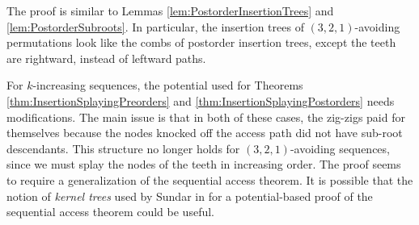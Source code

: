 \documentclass{article}
\theoremstyle{plain}
\theoremstyle{definition}
\begin{document}
%
The proof is similar to Lemmas \ref{lem:PostorderInsertionTrees} and
\ref{lem:PostorderSubroots}. In particular, the insertion trees of
$(3,2,1)$-avoiding permutations look like the combs of postorder insertion
trees, except the teeth are rightward, instead of leftward paths.

%
For $k$-increasing sequences, the potential used for Theorems
\ref{thm:InsertionSplayingPreorders} and \ref{thm:InsertionSplayingPostorders}
needs modifications. The main issue is that in both of these cases, the
zig-zigs paid for themselves because the nodes knocked off the access path did
not have sub-root descendants. This structure no longer holds for
$(3,2,1)$-avoiding sequences, since we must splay the nodes of the teeth in
increasing order. The proof seems to require a generalization of the sequential
access theorem. It is possible that the notion of \emph{kernel trees} used by
Sundar in \cite{SUNDAR_DEQUE} for a potential-based proof of the sequential
access theorem could be useful.

\printbibliography
\end{document}
